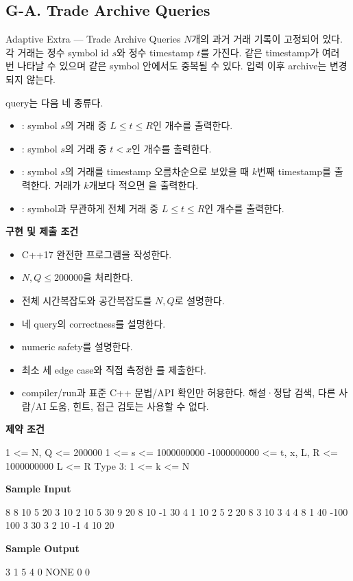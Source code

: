 \subsection{G-A. Trade Archive Queries}
\begin{problembox}{Adaptive Extra --- Trade Archive Queries}
$N$개의 과거 거래 기록이 고정되어 있다. 각 거래는 정수 symbol id $s$와 정수 timestamp $t$를 가진다. 같은 timestamp가 여러 번 나타날 수 있으며 같은 symbol 안에서도 중복될 수 있다. 입력 이후 archive는 변경되지 않는다.

query는 다음 네 종류다.
\begin{itemize}
\item {}: symbol $s$의 거래 중 $L\le t\le R$인 개수를 출력한다.
\item {}: symbol $s$의 거래 중 $t<x$인 개수를 출력한다.
\item {}: symbol $s$의 거래를 timestamp 오름차순으로 보았을 때 $k$번째 timestamp를 출력한다. 거래가 $k$개보다 적으면 을 출력한다.
\item {}: symbol과 무관하게 전체 거래 중 $L\le t\le R$인 개수를 출력한다.
\end{itemize}

\textbf{구현 및 제출 조건}
\begin{itemize}
\item C++17 완전한 프로그램을 작성한다.
\item $N,Q\le 200000$을 처리한다.
\item 전체 시간복잡도와 공간복잡도를 $N,Q$로 설명한다.
\item 네 query의 correctness를 설명한다.
\item numeric safety를 설명한다.
\item 최소 세 edge case와 직접 측정한 를 제출한다.
\item compiler/run과 표준 C++ 문법/API 확인만 허용한다. 해설·정답 검색, 다른 사람/AI 도움, 힌트, 접근 검토는 사용할 수 없다.
\end{itemize}

\textbf{제약 조건}
\begin{TextBlock}
1 <= N, Q <= 200000
1 <= s <= 1000000000
-1000000000 <= t, x, L, R <= 1000000000
L <= R
Type 3: 1 <= k <= N
\end{TextBlock}

\textbf{Sample Input}
\begin{TextBlock}
8 8
10 5
20 3
10 2
10 5
30 9
20 8
10 -1
30 4
1 10 2 5
2 20 8
3 10 3
4 4 8
1 40 -100 100
3 30 3
2 10 -1
4 10 20
\end{TextBlock}

\textbf{Sample Output}
\begin{TextBlock}
3
1
5
4
0
NONE
0
0
\end{TextBlock}
\end{problembox}

